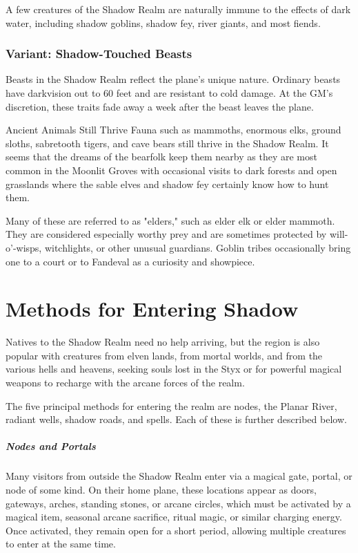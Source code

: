\documentclass[10pt,a4paper,twoside,bg=print,twocolumn,openany,nodeprecatedcode]{dndbook}
\begin{document}
A few creatures of the Shadow Realm are naturally immune to the effects of dark water, including shadow goblins, shadow fey, river giants, and most fiends.

\subsubsection{Variant: Shadow-Touched Beasts}
Beasts in the Shadow Realm reflect the plane's unique nature. Ordinary beasts have darkvision out to 60 feet and are resistant to cold damage. At the GM's discretion, these traits fade away a week after the beast leaves the plane.

\begin{DndSidebar}[float=!b]{Ancient Animals Still Thrive}
Fauna such as mammoths, enormous elks, ground sloths, sabretooth tigers, and cave bears still thrive in the Shadow Realm. It seems that the dreams of the bearfolk keep them nearby as they are most common in the Moonlit Groves with occasional visits to dark forests and open grasslands where the sable elves and shadow fey certainly know how to hunt them.



Many of these are referred to as "elders," such as elder elk or elder mammoth. They are considered especially worthy prey and are sometimes protected by will-o'-wisps, witchlights, or other unusual guardians. Goblin tribes occasionally bring one to a court or to Fandeval as a curiosity and showpiece.



\end{DndSidebar}

\section{Methods for Entering Shadow}
Natives to the Shadow Realm need no help arriving, but the region is also popular with creatures from elven lands, from mortal worlds, and from the various hells and heavens, seeking souls lost in the Styx or for powerful magical weapons to recharge with the arcane forces of the realm.

The five principal methods for entering the realm are nodes, the Planar River, radiant wells, shadow roads, and spells. Each of these is further described below.

\subparagraph{Nodes and Portals}
Many visitors from outside the Shadow Realm enter via a magical gate, portal, or node of some kind. On their home plane, these locations appear as doors, gateways, arches, standing stones, or arcane circles, which must be activated by a magical item, seasonal arcane sacrifice, ritual magic, or similar charging energy. Once activated, they remain open for a short period, allowing multiple creatures to enter at the same time.
\end{document}
